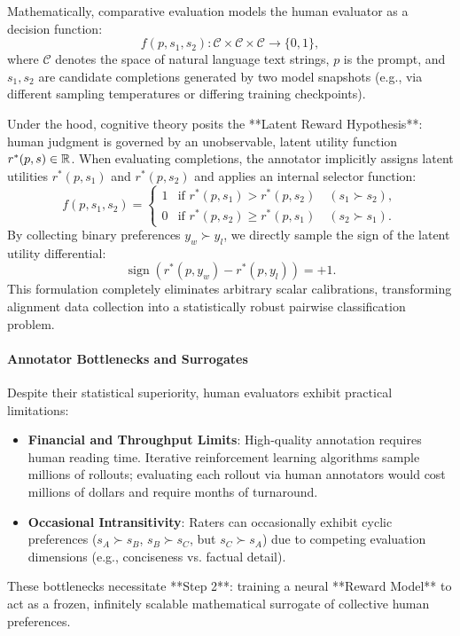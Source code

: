 \documentclass[../../../main.tex]{subfiles}
\begin{document}
Mathematically, comparative evaluation models the human evaluator as a decision function:
\begin{equation}
f(p, s_1, s_2): \mathcal{C} \times \mathcal{C} \times \mathcal{C} \longrightarrow \{0, 1\},
\end{equation}
where $\mathcal{C}$ denotes the space of natural language text strings, $p$ is the prompt, and $s_1, s_2$ are candidate completions generated by two model snapshots (e.g., via different sampling temperatures or differing training checkpoints).

Under the hood, cognitive theory posits the **Latent Reward Hypothesis**: human judgment is governed by an unobservable, latent utility function $r^*(p, s) \in \mathbb{R}$. When evaluating completions, the annotator implicitly assigns latent utilities $r^*(p, s_1)$ and $r^*(p, s_2)$ and applies an internal selector function:
\begin{equation}
f(p, s_1, s_2) = \begin{cases}
1 & \text{if } r^*(p, s_1) > r^*(p, s_2) \quad (s_1 \succ s_2), \\
0 & \text{if } r^*(p, s_2) \ge r^*(p, s_1) \quad (s_2 \succ s_1).
\end{cases}
\end{equation}
By collecting binary preferences $y_w \succ y_l$, we directly sample the sign of the latent utility differential:
\begin{equation}
\operatorname{sign}\left(r^*(p, y_w) - r^*(p, y_l)\right) = +1.
\end{equation}
This formulation completely eliminates arbitrary scalar calibrations, transforming alignment data collection into a statistically robust pairwise classification problem.

\paragraph{Annotator Bottlenecks and Surrogates}
Despite their statistical superiority, human evaluators exhibit practical limitations:
\begin{itemize}
    \item \textbf{Financial and Throughput Limits}: High-quality annotation requires human reading time. Iterative reinforcement learning algorithms sample millions of rollouts; evaluating each rollout via human annotators would cost millions of dollars and require months of turnaround.
    \item \textbf{Occasional Intransitivity}: Raters can occasionally exhibit cyclic preferences ($s_A \succ s_B$, $s_B \succ s_C$, but $s_C \succ s_A$) due to competing evaluation dimensions (e.g., conciseness vs. factual detail).
\end{itemize}
These bottlenecks necessitate **Step 2**: training a neural **Reward Model** to act as a frozen, infinitely scalable mathematical surrogate of collective human preferences.
\end{document}
